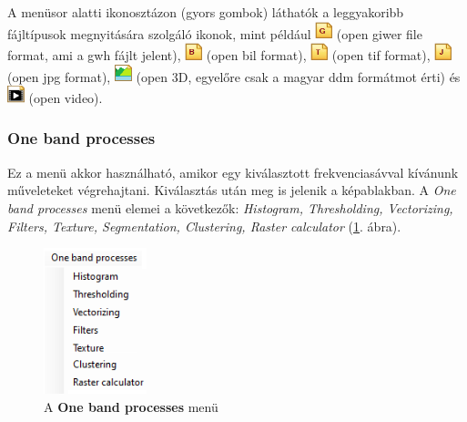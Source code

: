 \documentclass[a4paper,12pt]{article}
\begin{document}
A menüsor alatti ikonosztázon (gyors gombok) láthatók a leggyakoribb fájltípusok megnyitására szolgáló ikonok, mint például \includegraphics[width=0.5cm]{opengiwer.png} (open giwer file format, ami a gwh fájlt jelent), \includegraphics[width=0.5cm]{openbil.png} (open bil format), \includegraphics[width=0.5cm]{opentif.png} (open tif format), \includegraphics[width=0.5cm]{openjpg.png} (open jpg format), \includegraphics[width=0.5cm]{3d.png} (open 3D, egyelőre csak a magyar ddm formátmot érti) és \includegraphics[width=0.5cm]{openvideo.png} (open video).

	
\subsubsection{One band processes}

 
Ez a menü akkor használható, amikor egy kiválasztott frekvenciasávval kívánunk műveleteket végrehajtani. Kiválasztás után meg is jelenik a képablakban. %
 A \textit{One band processes} menü elemei a következők: \textit{Histogram, Thresholding, Vectorizing, Filters, Texture, Segmentation, Clustering, Raster calculator} (\ref{fig:onebandmenu}. ábra).

\begin{figure}
	\centering
	\includegraphics[width=3cm]{onebandmenu.png}
	\caption{A \textbf{One band processes} menü}
	\label{fig:onebandmenu}
\end{figure}
\end{document}

